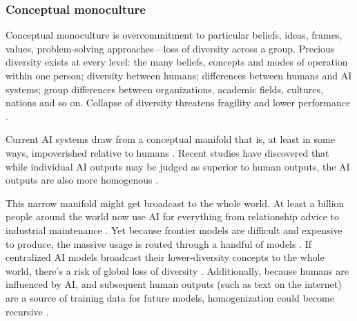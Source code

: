 \documentclass[12pt]{article}
\begin{document}
\subsubsection{Conceptual monoculture}

Conceptual monoculture is overcommitment to particular beliefs, ideas, frames, values, problem-solving approaches---loss of diversity across a group. Precious diversity exists at every level: the many beliefs, concepts and modes of operation within one person; diversity between humans; differences between humans and AI systems; group differences between organizations, academic fields, cultures, nations and so on. Collapse of diversity threatens fragility and lower performance \citep{kleinberg2021algorithmic,scott1998seeing, haldane2013rethinking, page2008difference, march1991exploration}. 

Current AI systems draw from a conceptual manifold that is, at least in some ways, impoverished relative to humans \citep{messeri2024artificial, crawford2021atlas, selwyn2024limits, kirk2023understanding, meincke2025chatgpt}. Recent studies have discovered that while individual AI outputs may be judged as superior to human outputs, the AI outputs are also more homogenous \citep{doshi2024generative, beguvs2024experimental, zhou2024generative, kosmyna2025your, agarwal2025ai, padmakumar2023does, xu2025echoes}. 

This narrow manifold might get broadcast to the whole world. At least a billion people around the world now use AI for everything from relationship advice to industrial maintenance \citep{chatterji2025chatgpt, mckinsey2025stateofai, openai2025enterprise, mccain2025claude, honeywell2024google, techcrunch2025sam, ccia2025survey}. Yet because frontier models are difficult and expensive to produce, the massive usage is routed through a handful of models \citep{bommasani2021opportunities}. If centralized AI models broadcast their lower-diversity concepts to the whole world, there's a risk of global loss of diversity \citep{sourati2026homogenizing, hao2026artificial}. Additionally, because humans are influenced by AI, and subsequent human outputs (such as text on the internet) are a source of training data for future models, homogenization could become recursive \citep{chaney2018algorithmic, osler2026hallucinating}. 


\end{document}
